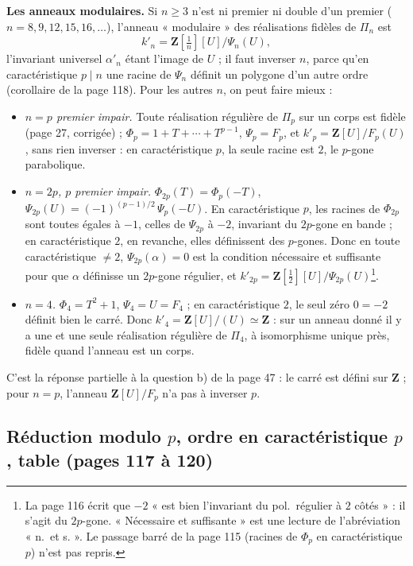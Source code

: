 \documentclass[11pt,a4paper]{article}
\begin{document}
\textbf{Les anneaux modulaires.} Si $n \geq 3$ n'est ni premier ni double d'un
premier ($n = 8, 9, 12, 15, 16, \ldots$), l'anneau « modulaire » des
réalisations fidèles de $\Pi_n$ est
\[
  k'_n = \mathbf{Z}[\tfrac1n][U]/\Psi_n(U) ,
\]
l'invariant universel $\alpha'_n$ étant l'image de $U$ ; il faut inverser $n$,
parce qu'en caractéristique $p \mid n$ une racine de $\Psi_n$ définit un
polygone d'un autre ordre (corollaire de la page 118). Pour les autres $n$, on
peut faire mieux :
\begin{itemize}
  \item \emph{$n = p$ premier impair.} Toute réalisation régulière de $\Pi_p$
    sur un corps est fidèle (page 27, corrigée) ; $\Phi_p = 1 + T + \cdots +
    T^{p-1}$, $\Psi_p = F_p$, et $k'_p = \mathbf{Z}[U]/F_p(U)$, sans rien
    inverser : en caractéristique $p$, la seule racine est $2$, le $p$-gone
    parabolique.
  \item \emph{$n = 2p$, $p$ premier impair.} $\Phi_{2p}(T) = \Phi_p(-T)$,
    $\Psi_{2p}(U) = (-1)^{(p-1)/2}\,\Psi_p(-U)$. En caractéristique $p$, les
    racines de $\Phi_{2p}$ sont toutes égales à $-1$, celles de $\Psi_{2p}$ à
    $-2$, invariant du $2p$-gone en bande ; en caractéristique $2$, en
    revanche, elles définissent des $p$-gones. Donc en toute caractéristique
    $\neq 2$, $\Psi_{2p}(\alpha) = 0$ est la condition nécessaire et suffisante
    pour que $\alpha$ définisse un $2p$-gone régulier, et $k'_{2p} =
    \mathbf{Z}[\frac12][U]/\Psi_{2p}(U)$\footnote{La page 116 écrit que $-2$
    « est bien l'invariant du pol.\ régulier à $2$ côtés » : il s'agit du
    $2p$-gone. « Nécessaire et suffisante » est une lecture de l'abréviation
    « n.\ et s. ». Le passage barré de la page 115 (racines de $\Phi_p$ en
    caractéristique $p$) n'est pas repris.}.
  \item \emph{$n = 4$.} $\Phi_4 = T^2 + 1$, $\Psi_4 = U = F_4$ ; en
    caractéristique $2$, le seul zéro $0 = -2$ définit bien le carré. Donc
    $k'_4 = \mathbf{Z}[U]/(U) \simeq \mathbf{Z}$ : sur un anneau donné il y a
    une et une seule réalisation régulière de $\Pi_4$, à isomorphisme unique
    près, fidèle quand l'anneau est un corps.
\end{itemize}
C'est la réponse partielle à la question b) de la page 47 : le carré est
défini sur $\mathbf{Z}$ ; pour $n = p$, l'anneau $\mathbf{Z}[U]/F_p$ n'a pas à
inverser $p$.

\subsection*{Réduction modulo $p$, ordre en caractéristique $p$, table (pages 117 à 120)}
\end{document}
